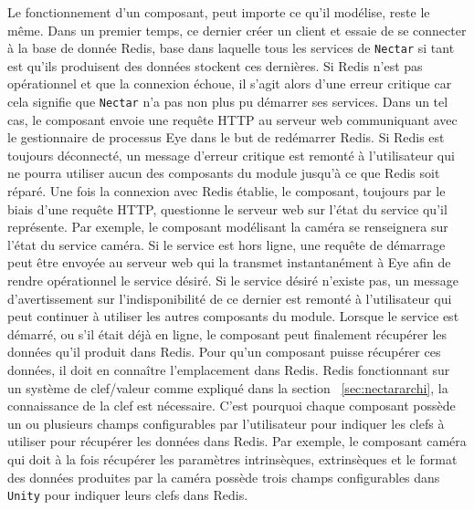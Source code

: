 Le fonctionnement d'un composant, peut importe ce qu'il modélise, reste le même. Dans un premier temps, ce dernier créer un client et essaie de se connecter à la base de donnée Redis, base dans laquelle tous les services de \texttt{Nectar} si tant est qu'ils produisent des données stockent ces dernières. Si Redis n'est pas opérationnel et que la connexion échoue, il s'agit alors d'une erreur critique car cela signifie que \texttt{Nectar} n'a pas non plus pu démarrer ses services. Dans un tel cas, le composant envoie une requête HTTP au serveur web communiquant avec le gestionnaire de processus Eye dans le but de redémarrer Redis. Si Redis est toujours déconnecté, un message d'erreur critique est remonté à l'utilisateur qui ne pourra utiliser aucun des composants du module jusqu'à ce que Redis soit réparé. 
Une fois la connexion avec Redis établie, le composant, toujours par le biais d'une requête HTTP, questionne le serveur web sur l'état du service qu'il représente. Par exemple, le composant modélisant la caméra se renseignera sur l'état du service caméra. Si le service est hors ligne, une requête de démarrage peut être envoyée au serveur web qui la transmet instantanément à Eye afin de rendre opérationnel le service désiré. Si le service désiré n'existe pas, un message d'avertissement sur l'indisponibilité de ce dernier est remonté à l'utilisateur qui peut continuer à utiliser les autres composants du module.
Lorsque le service est démarré, ou s'il était déjà en ligne, le composant peut finalement récupérer les données qu'il produit dans Redis. Pour qu'un composant puisse récupérer ces données, il doit en connaître l'emplacement dans Redis. Redis fonctionnant sur un système de clef/valeur comme expliqué dans la section ~\ref{sec:nectararchi}, la connaissance de la clef est nécessaire. C'est pourquoi chaque composant possède un ou plusieurs champs configurables par l'utilisateur pour indiquer les clefs à utiliser pour récupérer les données dans Redis. Par exemple, le composant caméra qui doit à la fois récupérer les paramètres intrinsèques, extrinsèques et le format des données produites par la caméra possède trois champs configurables dans \texttt{Unity} pour indiquer leurs clefs dans Redis.

